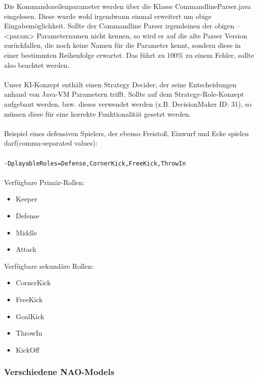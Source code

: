 \documentclass[fontsize=12pt,a4paper,final]{scrartcl}[2003/01/01]
\begin{document}
Die Kommandozeilenparameter werden über die Klasse CommandlineParser.java eingelesen. Diese wurde wohl irgendwann einmal erweitert um obige Eingabemöglichkeit. Sollte der Commandline Parser irgendeinen der obigen --<param> Parameternamen nicht kennen, so wird er auf die alte Parser Version zurückfallen, die noch keine Namen für die Parameter kennt, sondern diese in einer bestimmten Reihenfolge erwartet. Das führt zu 100\% zu einem Fehler, sollte also beachtet werden.\\
\\
Unser KI-Konzept enthält einen Strategy Decider, der seine Entscheidungen anhand von Java-VM Parametern trifft. Sollte auf dem Strategy-Role-Konzept aufgebaut werden, bzw. dieses verwendet werden (z.B. DecisionMaker ID: 31), so müssen diese für eine korrekte Funktionalität gesetzt werden.\\
\\
Beispiel eines defensiven Spielers, der ebenso Freistoß, Einwurf und Ecke spielen darf(comma-separated values):\\
\\
\texttt{-DplayableRoles=Defense,CornerKick,FreeKick,ThrowIn}\\
\\
Verfügbare Primär-Rollen:
\begin{itemize}
\item Keeper
\item Defense
\item Middle
\item Attack
\end{itemize}

Verfügbare sekundäre Rollen:
\begin{itemize}
\item CornerKick
\item FreeKick
\item GoalKick
\item ThrowIn
\item KickOff
\end{itemize}

\subsubsection{Verschiedene NAO-Models}
\end{document}
